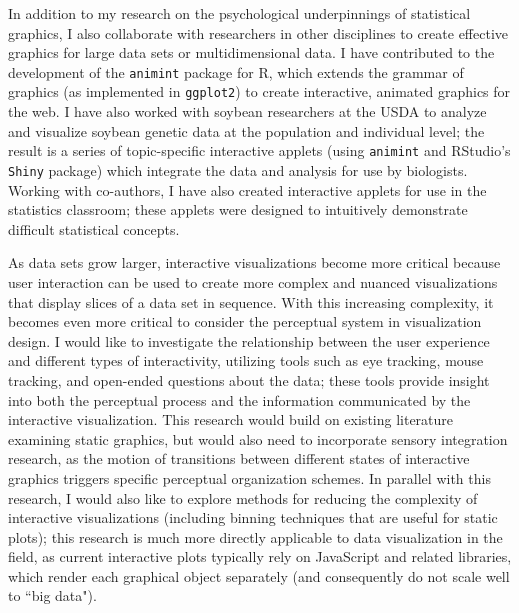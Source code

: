 \documentclass[11pt,letterpaper,sans,unicode]{moderncv}        %
\begin{document}
\vspace{.65cm}\hspace{8pt}In addition to my research on the psychological underpinnings of statistical graphics, I also collaborate with researchers in other disciplines to create effective graphics for large data sets or multidimensional data. I have contributed to the development of the \texttt{animint} package for R, which extends the grammar of graphics (as implemented in \texttt{ggplot2}) to create interactive, animated graphics for the web. I have also worked with soybean researchers at the USDA to analyze and visualize soybean genetic data at the population and individual level; the result is a series of topic-specific interactive applets (using \texttt{animint} and RStudio's \texttt{Shiny} package) which integrate the data and analysis for use by biologists. Working with co-authors, I have also created interactive applets for use in the statistics classroom; these applets were designed to intuitively demonstrate difficult statistical concepts. 


\vspace{.65cm}\hspace{8pt} As data sets grow larger, interactive visualizations become more critical because user interaction can be used to create more complex and nuanced visualizations that display slices of a data set in sequence. With this increasing complexity, it becomes even more critical to consider the perceptual system in visualization design. I would like to investigate the relationship between the user experience and different types of interactivity, utilizing tools such as eye tracking, mouse tracking, and open-ended questions about the data; these tools provide insight into both the perceptual process and the information communicated by the interactive visualization. This research would build on existing literature examining static graphics, but would also need to incorporate sensory integration research, as the motion of transitions between different states of interactive graphics triggers specific perceptual organization schemes. In parallel with this research, I would also like to explore methods for reducing the complexity of interactive visualizations (including binning techniques that are useful for static plots); this research is much more directly applicable to data visualization in the field, as current interactive plots typically rely on JavaScript and related libraries, which render each graphical object separately (and consequently do not scale well to ``big data"). 
\end{document}
